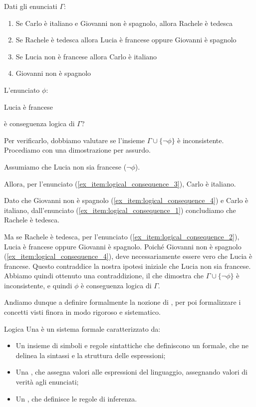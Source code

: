 \begin{example}[label=ex:logical_consequence]{}
  Dati gli enunciati \(\Gamma\):
  \begin{enumerate}
    \item Se Carlo è italiano e Giovanni non è spagnolo, allora Rachele è tedesca\label{ex_item:logical_consequence_1}
    \item Se Rachele è tedesca allora Lucia è francese oppure Giovanni è spagnolo\label{ex_item:logical_consequence_2}
    \item Se Lucia non è francese allora Carlo è italiano\label{ex_item:logical_consequence_3}
    \item Giovanni non è spagnolo\label{ex_item:logical_consequence_4}
  \end{enumerate}
  L'enunciato \(\phi\):
  \begin{center}
    Lucia è francese
  \end{center}
  è conseguenza logica di \(\Gamma\)?
  
  Per verificarlo, dobbiamo valutare se l'insieme \(\Gamma \cup \{\neg \phi\}\) è inconsistente.
  Procediamo con una dimostrazione per assurdo.
  
  Assumiamo che Lucia non sia francese (\(\neg \phi\)).

  Allora, per l'enunciato (\ref{ex_item:logical_consequence_3}), Carlo è italiano. 

  Dato che Giovanni non è spagnolo (\ref{ex_item:logical_consequence_4}) e Carlo è italiano, dall'enunciato (\ref{ex_item:logical_consequence_1}) concludiamo che Rachele è tedesca.

  Ma se Rachele è tedesca, per l'enunciato (\ref{ex_item:logical_consequence_2}), Lucia è francese oppure Giovanni è spagnolo.
  Poiché Giovanni non è spagnolo (\ref{ex_item:logical_consequence_4}), deve necessariamente essere vero che Lucia è francese.
  Questo contraddice la nostra ipotesi iniziale che Lucia non sia francese.
  Abbiamo quindi ottenuto una contraddizione, il che dimostra che \(\Gamma \cup \{\neg \phi\}\) è inconsistente, e quindi \(\phi\) è conseguenza logica di \(\Gamma\).
\end{example}

Andiamo dunque a definire formalmente la nozione di , per poi formalizzare i concetti visti finora in modo rigoroso e sistematico.

\begin{definition}{Logica}
  Una  è un sistema formale caratterizzato da:
  \begin{itemize}
    \item Un insieme di simboli e regole sintattiche che definiscono un  formale, che ne delinea la sintassi e la struttura delle espressioni;
    \item Una , che assegna valori alle espressioni del linguaggio, assegnando valori di verità agli enunciati;
    \item Un , che definisce le regole di inferenza.
  \end{itemize}
\end{definition}

